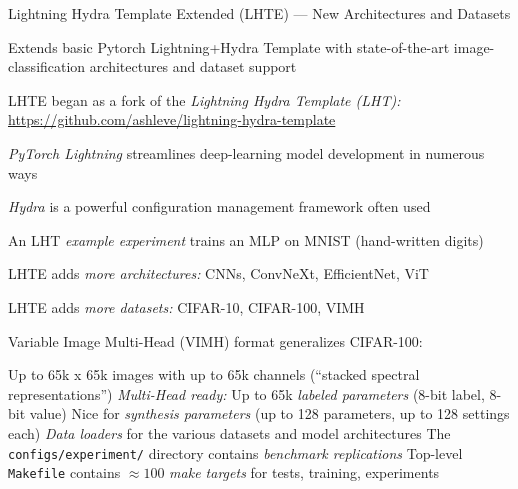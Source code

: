 \begin{slide}[\slideopts,toc={Lightning Hydra Template Ext}]{Lightning Hydra Template Extended (LHTE) --- New Architectures and Datasets}


\vspace{-1em}
  

  \begin{itemize}

    \mpitem Extends basic Pytorch Lightning+Hydra Template with state-of-the-art image-classification architectures and dataset support

    \mpitem LHTE began as a fork of the \emph{Lightning Hydra Template (LHT):} \url{https://github.com/ashleve/lightning-hydra-template}
    \begin{itemize}

      \mpitem \emph{PyTorch Lightning} streamlines deep-learning model development in
      numerous ways

      \mpitem \emph{Hydra} is a powerful configuration management framework often used

      \mpitem An LHT \emph{example experiment} trains an MLP on MNIST (hand-written digits)

    \end{itemize}

    \mpitem LHTE adds \emph{more architectures:} CNNs, ConvNeXt, EfficientNet, ViT

    \mpitem LHTE adds \emph{more datasets:} CIFAR-10, CIFAR-100, VIMH

    \mpitem Variable Image Multi-Head (VIMH) format generalizes CIFAR-100:
    \begin{itemize}
      \mpitem Up to 65k x 65k images with up to 65k channels (``stacked spectral representations'')
      \mpitem \emph{Multi-Head ready:} Up to 65k \emph{labeled parameters} (8-bit label, 8-bit value)
      \mpitem Nice for \emph{synthesis parameters} (up to 128 parameters, up to 128 settings each)
      \mpitem \emph{Data loaders} for the various datasets and model architectures
      \mpitem The \texttt{configs/experiment/} directory contains \emph{benchmark replications} %
      \mpitem Top-level \texttt{Makefile} contains $\approx100$ \emph{make targets} for tests, training, experiments
    \end{itemize}
  \end{itemize}

\end{slide}

